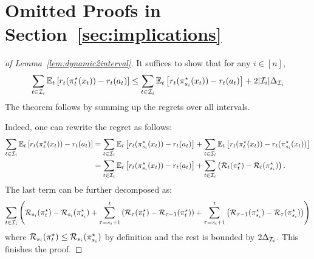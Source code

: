 \section{Omitted Proofs in Section~\ref{sec:implications}}\label{app:dynamic2interval}
\begin{proof}[of Lemma~\ref{lem:dynamic2interval}]
It suffices to show that for any $i \in [n]$,
\[
\sum_{t\in{\mathcal{I}}_i}\mathbb{E}_t\left[  r_t(\pi^\star_t(x_t)) - r_t(a_t) \right] \leq 
\sum_{t\in{\mathcal{I}}_i}\mathbb{E}_t\left[  r_t(\pi^\star_{s_i}(x_t)) - r_t(a_t) \right] + 2|{\mathcal{I}}_i|\Delta_{{\mathcal{I}}_i}
\]
The theorem follows by summing up the regrets over all intervals.

Indeed, one can rewrite the regret as follows:
\begin{align*}
\sum_{t\in{\mathcal{I}}_i}\mathbb{E}_t\left[  r_t(\pi^\star_t(x_t)) - r_t(a_t) \right]
&=\sum_{t\in{\mathcal{I}}_i} \mathbb{E}_t\left[  r_t(\pi^\star_{s_i}(x_t)) - r_t(a_t) \right]
+ \sum_{t\in{\mathcal{I}}_i}\mathbb{E}_t\left[ r_t(\pi^\star_t(x_t)) - r_t(\pi^\star_{s_i}(x_t)) \right]\\
&= \sum_{t\in{\mathcal{I}}_i} \mathbb{E}_t\left[  r_t(\pi^\star_{s_i}(x_t)) - r_t(a_t) \right]
+ \sum_{t\in{\mathcal{I}}_i} \left( {\mathcal{R}}_t(\pi^\star_t) - {\mathcal{R}}_t(\pi^\star_{s_i}) \right).
\end{align*}
The last term can be further decomposed as:
\[
\sum_{t\in{\mathcal{I}}_i} \left(
{\mathcal{R}}_{s_i}(\pi^\star_t)  - {\mathcal{R}}_{s_i}(\pi^\star_{s_i}) +
\sum_{\tau = s_i+1}^t \left( {\mathcal{R}}_\tau(\pi^\star_t) - {\mathcal{R}}_{\tau-1}(\pi^\star_t) \right) +
\sum_{\tau = s_i+1}^t \left( {\mathcal{R}}_{\tau-1}(\pi^\star_{s_i})  - {\mathcal{R}}_\tau(\pi^\star_{s_i}) \right) 
\right)
\]
where ${\mathcal{R}}_{s_i}(\pi^\star_t) \leq {\mathcal{R}}_{s_i}(\pi^\star_{s_i})$ by definition
and the rest is bounded by $2\Delta_{{\mathcal{I}}_i}$. This finishes the proof.
\end{proof}


